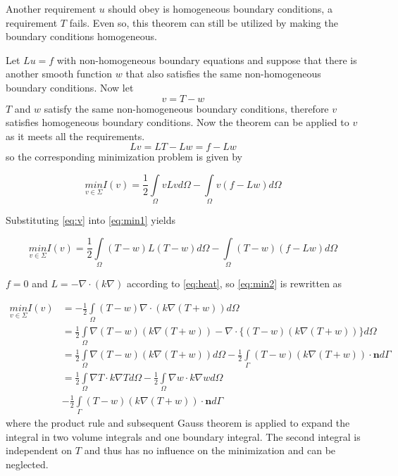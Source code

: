 \documentclass[10pt,a4paper]{article}
\begin{document}
Another requirement $u$ should obey is homogeneous boundary conditions, a requirement $T$ fails. Even so, this theorem can still be utilized by making the boundary conditions homogeneous.

Let $Lu=f$ with non-homogeneous boundary equations and suppose that there is another smooth function $w$ that also satisfies the same non-homogeneous boundary conditions. Now let 
\begin{equation}\label{eq:v}
v=T-w
\end{equation}
$T$ and $w$ satisfy the same non-homogeneous boundary conditions, therefore $v$ satisfies homogeneous boundary conditions. Now the theorem can be applied to $v$ as it meets all the requirements. \\

\begin{equation}\label{rhsv}
Lv=LT-Lw=f-Lw
\end{equation}
so the corresponding minimization problem is given by 

\begin{equation}\label{eq:min1}
\underset{v\in\Sigma} {min}I(v) = \frac{1}{2}\underset{\Omega}{\int}vLvd\Omega-\underset{\Omega}{\int}v(f-Lw)d\Omega
\end{equation}

Substituting \eqref{eq:v} into \eqref{eq:min1} yields

\begin{equation}\label{eq:min2}
\underset{v\in\Sigma} {min}I(v) = \frac{1}{2}\underset{\Omega}{\int}(T-w)L(T-w)d\Omega-\underset{\Omega}{\int}(T-w)(f-Lw)d\Omega
\end{equation}

$f=0$ and $L = -\nabla\cdot( k\nabla)$ according to \eqref{eq:heat}, so \eqref{eq:min2} is rewritten as

\begin{equation}\label{eq:min3}
	\begin{split}
	\underset{v\in\Sigma} {min}I(v) & = -\frac{1}{2}\underset{\Omega}{\int}(T-w)\nabla\cdot(k\nabla(T+w))d\Omega\\
	&=\frac{1}{2}\underset{\Omega}{\int}\nabla (T-w)(k\nabla(T+w))-\nabla\cdot\{(T-w)(k\nabla(T+w))\}d\Omega\\
	&=\frac{1}{2}\underset{\Omega}{\int}\nabla (T-w)(k\nabla(T+w))d\Omega - \frac{1}{2}\underset{\Gamma}{\int}(T-w)(k\nabla(T+w))\cdot\textbf{\^{n}} d\Gamma\\
	&=\frac{1}{2}\underset{\Omega}{\int}\nabla T\cdot k \nabla T d\Omega - \frac{1}{2}\underset{\Omega}{\int}\nabla w\cdot k \nabla w d\Omega\\  &-\frac{1}{2}\underset{\Gamma}{\int}(T-w)(k\nabla(T+w))\cdot\textbf{\^{n}} d\Gamma
	\end{split}
\end{equation}
where the product rule and subsequent Gauss theorem is applied to expand the integral in two volume integrals and one boundary integral. The second integral is independent on $T$ and thus has no influence on the minimization and can be neglected. \\
\end{document}
